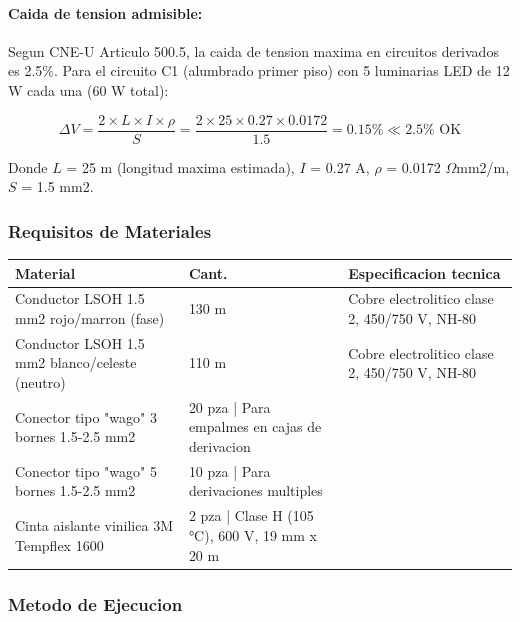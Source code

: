 \paragraph{Caida de tension admisible:}
Segun CNE-U Articulo 500.5, la caida de tension maxima en circuitos derivados es 2.5\%. Para el circuito C1 (alumbrado primer piso) con 5 luminarias LED de 12 W cada una (60 W total):

\begin{equation}
\Delta V = \frac{2 \times L \times I \times \rho}{S} = \frac{2 \times 25 \times 0.27 \times 0.0172}{1.5} = 0.15\% \ll 2.5\% \text{ OK}
\end{equation}

Donde $L$ = 25 m (longitud maxima estimada), $I$ = 0.27 A, $\rho$ = 0.0172 $\Omega$mm2/m, $S$ = 1.5 mm2.

\subsubsection{Requisitos de Materiales}

\begin{longtable}{L{5.0cm} L{2.0cm} L{7.5cm}}
\toprule
\textbf{Material} & \textbf{Cant.} & \textbf{Especificacion tecnica} \\
\midrule
Conductor LSOH 1.5 mm2 rojo/marron (fase) & 130 m & Cobre electrolitico clase 2, 450/750 V, NH-80 \\
Conductor LSOH 1.5 mm2 blanco/celeste (neutro) & 110 m & Cobre electrolitico clase 2, 450/750 V, NH-80 \\
Conector tipo "wago" 3 bornes 1.5-2.5 mm2 & 20 pza | Para empalmes en cajas de derivacion \\
Conector tipo "wago" 5 bornes 1.5-2.5 mm2 & 10 pza | Para derivaciones multiples \\
Cinta aislante vinilica 3M Tempflex 1600 & 2 pza | Clase H (105 °C), 600 V, 19 mm x 20 m \\
\bottomrule
\end{longtable}

\subsubsection{Metodo de Ejecucion}

